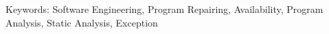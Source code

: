 \documentclass[letterpaper,11pt]{report}
\begin{document}


\newpage

\pagestyle{empty}
\vspace*{7.1in} 
Keywords: Software Engineering, Program Repairing, Availability, Program
Analysis, Static Analysis, Exception

\newpage

\onehalfspacing



\doublespacing


\newpage
\pagestyle{empty}

\newpage






\newpage

\tableofcontents
\listoffigures 
\listoftables
\lstlistoflistings

\newpage

\newpage

\newpage
\mbox{}



\setcounter{page}{1}
\doublespacing












\end{document}
